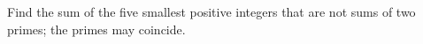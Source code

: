 Find the sum of the five smallest positive integers that are not sums of two primes; the primes may coincide.
